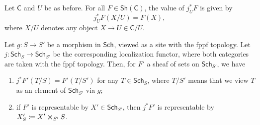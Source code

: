 \begin{rem}
	Let $\mathsf{C}$ and $U$ be as before.
	For all $F \in \mathsf{Sh}\left(\mathsf{C}\right)$, the value of $j_U^*F$
	is given by
	\begin{equation*}
		j_U^*F(X/U) = F(X)
	,\end{equation*}
	where $X/U$ denotes any object $X \to U \in \mathsf{C}/U$.
\end{rem}


\begin{lem}
	Let $g\colon S \to S'$ be a morphism in $\mathsf{Sch}_{  }$, viewed
	as a site with the fppf topology.
	Let $j\colon \mathsf{Sch}_{ S } \to \mathsf{Sch}_{ S' }$ be the corresponding
	localization functor, where both categories are taken with the fppf topology.
	Then, for $F'$ a sheaf of sets on $\mathsf{Sch}_{ S' }$, we have
\begin{enumerate}
	\item $j^* F'(T/S) = F'(T/S')$ for any $T \in \mathsf{Sch}_{ S }$,
		where $T/S'$ means that we view $T$ as an element of $\mathsf{Sch}_{ S' }$
		via $g$;
	\item if $F'$ is representable by $X' \in \mathsf{Sch}_{ S' }$,
		then $j^*F'$ is representable by $X'_S \coloneqq X' \cross_{ S' } S$.
\end{enumerate}
\end{lem} 
